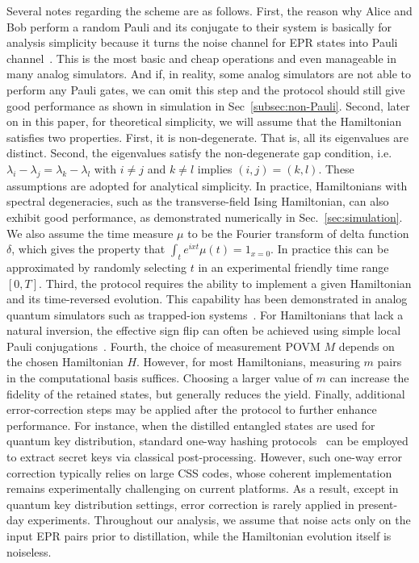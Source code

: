 \documentclass[onecolumn,prx,longbibliography,nofootinbib, superscriptaddress]{revtex4-2}
\theoremstyle{recap}
\begin{document}
Several notes regarding the scheme are as follows. First, the reason why Alice and Bob perform a random Pauli and its conjugate to their system is basically for analysis simplicity because it turns the noise channel for EPR states into Pauli channel~\cite{BDSW}. This is the most basic and cheap operations and even manageable in many analog simulators. And if, in reality, some analog simulators are not able to perform any Pauli gates, we can omit this step and the protocol should still give good performance as shown in simulation in Sec~\ref{subsec:non-Pauli}. Second, later on in this paper, for theoretical simplicity, we will assume that the Hamiltonian satisfies two properties. First, it is non-degenerate. That is, all its eigenvalues are distinct. Second, the eigenvalues satisfy the non-degenerate gap condition, i.e. $\lambda_i-\lambda_j=\lambda_k-\lambda_l$ with $i\neq j$ and $k\neq l$ implies $(i,j)=(k,l)$. These assumptions are adopted for analytical simplicity. In practice, Hamiltonians with spectral degeneracies, such as the transverse-field Ising Hamiltonian, can also exhibit good performance, as demonstrated numerically in Sec.~\ref{sec:simulation}. We also assume the time measure $\mu$ to be the Fourier transform of delta function $\delta$, which gives the property that $\int_{t}e^{ixt}\mu(t)=1_{x=0}$. In practice this can be approximated by randomly selecting $t$ in an experimental friendly time range $[0,T]$. Third, the protocol requires the ability to implement a given Hamiltonian and its time-reversed evolution. This capability has been demonstrated in analog quantum simulators such as trapped-ion systems~\cite{Gaerttner2017, Richerme2014}. For Hamiltonians that lack a natural inversion, the effective sign flip can often be achieved using simple local Pauli conjugations~\cite{Monroe21RMP}. Fourth, the choice of measurement POVM $M$ depends on the chosen Hamiltonian $H$. However, for most Hamiltonians, measuring $m$ pairs in the computational basis suffices. Choosing a larger value of $m$ can increase the fidelity of the retained states,
but generally reduces the yield. Finally, additional error-correction steps may be applied after the protocol to further enhance performance. For instance, when the distilled entangled states are used for quantum key distribution, standard one-way hashing protocols~\cite{BDSW} can be employed to extract secret keys via classical post-processing. However, such one-way error correction typically relies on large CSS codes, whose coherent implementation remains experimentally challenging on current platforms. As a result, except in quantum key distribution settings, error correction is rarely applied in present-day experiments. Throughout our analysis, we assume that noise acts only on the input EPR pairs prior to distillation, while the Hamiltonian evolution itself is noiseless.
\end{document}
